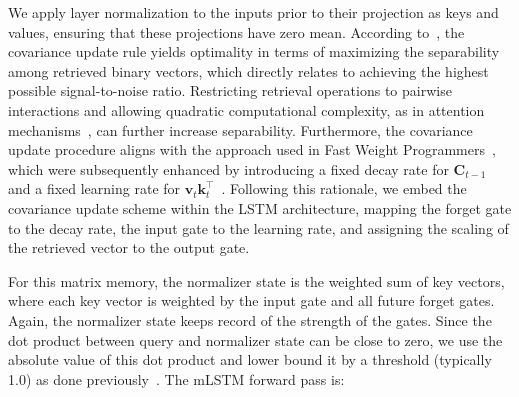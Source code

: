 We apply layer normalization to the inputs prior to their projection as keys and values, ensuring that these projections have zero mean. According to~\citep{Dayan:91}, the covariance update rule yields optimality in terms of maximizing the separability among retrieved binary vectors, which directly relates to achieving the highest possible signal-to-noise ratio. Restricting retrieval operations to pairwise interactions and allowing quadratic computational complexity, as in attention mechanisms~\citep{Krotov:16,Krotov:17,Ramsauer:21}, can further increase separability. Furthermore, the covariance update procedure aligns with the approach used in Fast Weight Programmers~\citep{Schmidhuber:92ncfastweights,Schlag:21}, which were subsequently enhanced by introducing a fixed decay rate for $\mathbf{C}_{t-1}$ and a fixed learning rate for $\mathbf{v}_{t} \mathbf{k}_t ^\top$~\citep{Ba:16}. Following this rationale, we embed the covariance update scheme within the LSTM architecture, mapping the forget gate to the decay rate, the input gate to the learning rate, and assigning the scaling of the retrieved vector to the output gate.

For this matrix memory, the normalizer state is the weighted sum of key vectors, where each key vector is weighted by the input gate and all future forget gates. Again, the normalizer state keeps record of the strength of the gates. Since the dot product between query and normalizer state can be close to zero, we use the absolute value of this dot product and lower bound it by a threshold (typically 1.0) as done previously~\citep{Sun:23arxiv}. The mLSTM forward pass is:

